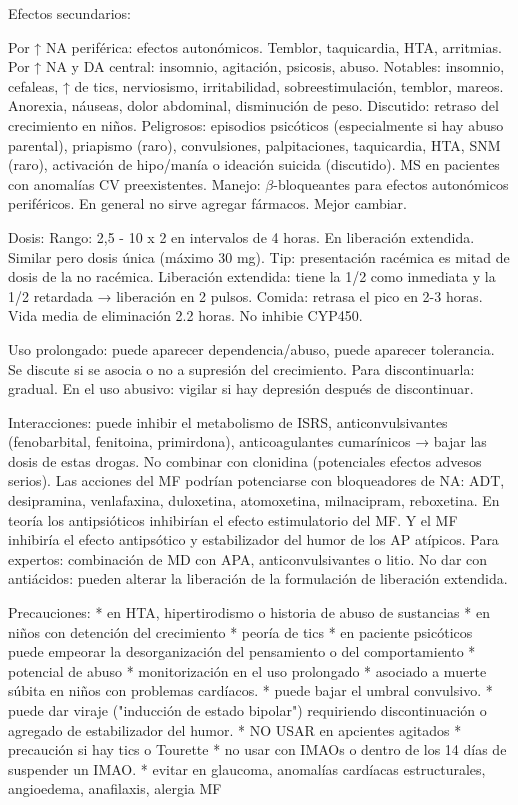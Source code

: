Efectos secundarios:

Por ↑ NA periférica: efectos autonómicos. Temblor, taquicardia, HTA, arritmias.
Por ↑ NA y DA central: insomnio, agitación, psicosis, abuso.
Notables: insomnio, cefaleas, ↑ de tics, nerviosismo, irritabilidad, sobreestimulación, temblor, mareos. Anorexia, náuseas, dolor abdominal, disminución de peso. Discutido: retraso del crecimiento en niños.
Peligrosos: episodios psicóticos (especialmente si hay abuso parental), priapismo (raro), convulsiones, palpitaciones, taquicardia, HTA, SNM (raro), activación de hipo/manía o ideación suicida (discutido). MS en pacientes con anomalías CV preexistentes.
Manejo: $\beta$-bloqueantes para efectos autonómicos periféricos. En general no sirve agregar fármacos. Mejor cambiar.

Dosis:
Rango: 2,5 - 10 x 2 en intervalos de 4 horas. En liberación extendida. Similar pero dosis única (máximo 30 mg).
Tip: presentación racémica es mitad de dosis de la no racémica. Liberación extendida: tiene la 1/2 como inmediata y la 1/2 retardada → liberación en 2 pulsos. Comida: retrasa el pico en 2-3 horas. Vida media de eliminación 2.2 horas. No inhibie CYP450.

Uso prolongado: puede aparecer dependencia/abuso, puede aparecer tolerancia. Se discute si se asocia o no a supresión del crecimiento. Para discontinuarla: gradual. En el uso abusivo: vigilar si hay depresión después de discontinuar.

Interacciones: puede inhibir el metabolismo de ISRS, anticonvulsivantes (fenobarbital, fenitoina, primirdona), anticoagulantes cumarínicos → bajar las dosis de estas drogas. No combinar con clonidina (potenciales efectos advesos serios). Las acciones del MF podrían potenciarse con bloqueadores de NA: ADT, desipramina, venlafaxina, duloxetina, atomoxetina, milnacipram, reboxetina. En teoría los antipsióticos inhibirían el efecto estimulatorio del MF. Y el MF inhibiría el efecto antipsótico y estabilizador del humor de los AP atípicos.
Para expertos: combinación de MD con APA, anticonvulsivantes o litio.
No dar con antiácidos: pueden alterar la liberación de la formulación de liberación extendida.

Precauciones:
* en HTA, hipertirodismo o historia de abuso de sustancias
* en niños con detención del crecimiento
* peoría de tics
* en paciente psicóticos puede empeorar la desorganización del pensamiento o del comportamiento
* potencial de abuso
* monitorización en el uso prolongado
* asociado a muerte súbita en niños con problemas cardíacos.
* puede bajar el umbral convulsivo.
* puede dar viraje ("inducción de estado bipolar") requiriendo discontinuación o agregado de estabilizador del humor.
* NO USAR en apcientes agitados
* precaución si hay tics o Tourette
* no usar con IMAOs o dentro de los 14 días de suspender un IMAO.
* evitar en glaucoma, anomalías cardíacas estructurales, angioedema, anafilaxis, alergia MF

